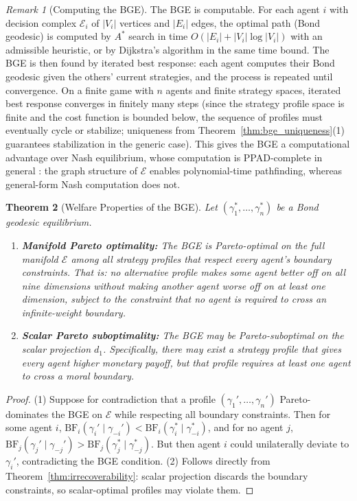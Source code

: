 \documentclass[12pt]{article}
\newtheorem{theorem}{Theorem}[section]
\theoremstyle{definition}
\theoremstyle{remark}
\newtheorem{remark}[theorem]{Remark}
\newcommand{\E}{\mathcal{E}}               %
\newcommand{\BF}{\mathrm{BF}}              %
\begin{document}
\begin{remark}[Computing the BGE]
The BGE is computable.  For each agent $i$ with decision complex $\E_i$ of $|V_i|$ vertices and $|E_i|$ edges, the optimal path (Bond geodesic) is computed by $A^*$ search in time $O(|E_i| + |V_i| \log |V_i|)$ with an admissible heuristic, or by Dijkstra's algorithm in the same time bound.  The BGE is then found by iterated best response: each agent computes their Bond geodesic given the others' current strategies, and the process is repeated until convergence.  On a finite game with $n$ agents and finite strategy spaces, iterated best response converges in finitely many steps (since the strategy profile space is finite and the cost function is bounded below, the sequence of profiles must eventually cycle or stabilize; uniqueness from Theorem~\ref{thm:bge_uniqueness}(1) guarantees stabilization in the generic case).  This gives the BGE a computational advantage over Nash equilibrium, whose computation is PPAD-complete in general \cite{nash1950}: the graph structure of $\E$ enables polynomial-time pathfinding, whereas general-form Nash computation does not.
\end{remark}

\begin{theorem}[Welfare Properties of the BGE]
\label{thm:welfare}
Let $(\gamma_1^*, \ldots, \gamma_n^*)$ be a Bond geodesic equilibrium.
\begin{enumerate}
    \item \textbf{Manifold Pareto optimality:} The BGE is Pareto-optimal on the full manifold $\E$ among all strategy profiles that respect every agent's boundary constraints.  That is: no alternative profile makes some agent better off on all nine dimensions without making another agent worse off on at least one dimension, subject to the constraint that no agent is required to cross an infinite-weight boundary.
    \item \textbf{Scalar Pareto suboptimality:} The BGE may be Pareto-suboptimal on the scalar projection $d_1$.  Specifically, there may exist a strategy profile that gives every agent higher monetary payoff, but that profile requires at least one agent to cross a moral boundary.
\end{enumerate}
\end{theorem}

\begin{proof}
(1) Suppose for contradiction that a profile $(\gamma_1', \ldots, \gamma_n')$ Pareto-dominates the BGE on $\E$ while respecting all boundary constraints.  Then for some agent $i$, $\BF_i(\gamma_i' \mid \gamma_{-i}') < \BF_i(\gamma_i^* \mid \gamma_{-i}^*)$, and for no agent $j$, $\BF_j(\gamma_j' \mid \gamma_{-j}') > \BF_j(\gamma_j^* \mid \gamma_{-j}^*)$.  But then agent $i$ could unilaterally deviate to $\gamma_i'$, contradicting the BGE condition.  (2) Follows directly from Theorem~\ref{thm:irrecoverability}: scalar projection discards the boundary constraints, so scalar-optimal profiles may violate them.
\end{proof}
\end{document}
